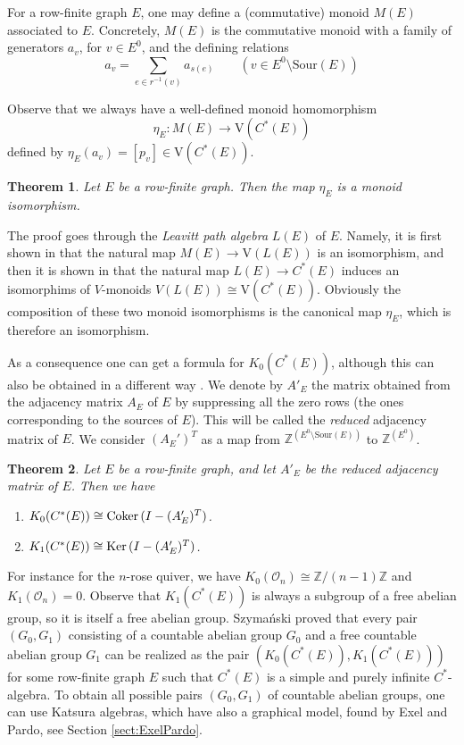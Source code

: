 \documentclass[11pt]{amsart}
\theoremstyle{plain}            %
\newtheorem{theorem}{Theorem}[section]
\theoremstyle{definition}       %
\theoremstyle{definition}       %
\theoremstyle{remark}
\newcommand{\V}{\mathrm{V}}
\newcommand{\Sour}{\mathrm{Sour}}
\def\Z{\mathbb{Z}}
\def\ker{{\rm Ker}\,}
\def\coker{{\rm Coker}\,}
\def\ker{{\rm Ker}\,}
\begin{document}
For a row-finite graph $E$, one may define a (commutative) monoid $M(E)$ associated to $E$. Concretely, $M(E)$ is the commutative monoid with a family of generators $a_v$, for $v\in E^0$, and the defining relations
\begin{equation*}
	a_v = \sum _{e\in r^{-1}(v)} a_{s(e)}  \qquad (v\in E^0\setminus \Sour (E))
\end{equation*} 

Observe that we always have a well-defined monoid homomorphism
$$\eta_E\colon M(E)\to \V (C^*(E))$$ defined by $\eta_E (a_v) = [p_v]\in \V (C^*(E))$. 

\begin{theorem}{\rm \cite{amp07}}
	\label{thm:APM}
	Let $E$ be a row-finite graph. Then the map $\eta_E$ is a monoid isomorphism.   
\end{theorem}

The proof goes through the {\it Leavitt path algebra} $L(E)$ of $E$. Namely, it is first shown in \cite[Theorem 3.5]{amp07} that the natural map $M(E)\to \V (L(E))$ is an isomorphism, and then it is shown in \cite[Theorem 7.1]{amp07} that the natural map $L(E)\to C^*(E)$ induces an isomorphims of $V$-monoids
$V(L(E))\cong \V(C^*(E))$. Obviously the composition of these two monoid isomorphisms is the canonical map
$\eta_E$, which is therefore an isomorphism.  

As a consequence one can get a formula for $K_0(C^*(E))$, although this can also be obtained in a different way \cite[Chapter 7]{rae}. We denote by $A'_E$ the matrix obtained from the adjacency matrix $A_E$ of $E$ by suppressing all the zero rows (the ones corresponding to the sources of $E$). This will be called the {\it reduced} adjacency matrix of $E$. 
We consider $(A_E')^T$ as a map from $\Z^{(E^0\setminus \Sour (E))}$ to $\Z^{(E^0)}$. 

\begin{theorem}{\rm \cite[Chapter 7]{rae}}
	\label{thm:KtheoryofgraphCs}
	Let $E$ be a row-finite graph, and let $A'_E$ be the reduced adjacency matrix of $E$. Then we have
	\begin{enumerate}
		\item[(a)] $K_0 (C^*(E))\cong \coker (I-(A_E')^T)$.
		\item[(b)] $K_1(C^*(E))	\cong \ker (I-(A_E')^T)$. 
	\end{enumerate}	
\end{theorem}

For instance for the $n$-rose quiver, we have $K_0(\mathcal O _n)\cong \Z/(n-1)\Z$
and $K_1(\mathcal O _n)= 0$. Observe that $K_1( C^*(E) )$ is always a subgroup of a free abelian group, so it is itself a free abelian group. Szymański \cite{szy} proved that every pair $(G_0,G_1)$ consisting of a countable abelian group $G_0$ and a free countable abelian group $G_1$ can be realized as the pair $(K_0(C^*(E)),K_1(C^*(E)))$ for some row-finite graph $E$ such that $C^*(E)$ is a simple and purely infinite $C^*$-algebra. To obtain all possible pairs $(G_0,G_1)$ of countable abelian groups, one can use Katsura algebras, which have also a graphical model, found by Exel and Pardo, see Section \ref{sect:ExelPardo}. 
\end{document}
